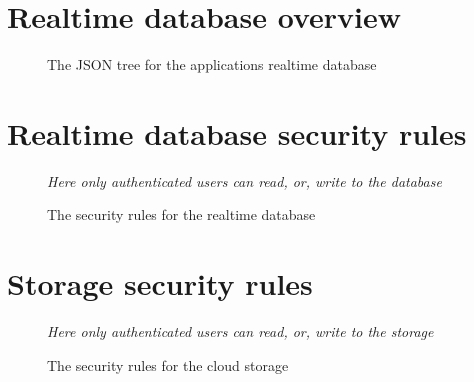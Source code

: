 \section{Realtime database overview}\label{appendix:rtdb}
\begin{figure}[!htbp]
    \centering
    \begin{subfigure}[b]{\textwidth}
    \end{subfigure}
    \caption{The JSON tree for the applications realtime database}
\end{figure}
\FloatBarrier
\newpage

\section{Realtime database security rules}\label{appendix:securityRulesRTDB}
\begin{figure}[!htbp]
    \centering
    \begin{subfigure}[b]{0.6\textwidth}
    \end{subfigure}
    \caption{The security rules for the realtime database}
    \small\textit{Here only authenticated users can read, or, write to the database}
\end{figure}
\FloatBarrier
\newpage

\section{Storage security rules}\label{appendix:securityRulesStor}
\begin{figure}[!htbp]
    \centering
    \begin{subfigure}[b]{0.8\textwidth}
    \end{subfigure}
    \caption{The security rules for the cloud storage}
    \small\textit{Here only authenticated users can read, or, write to the storage}
\end{figure}
\FloatBarrier